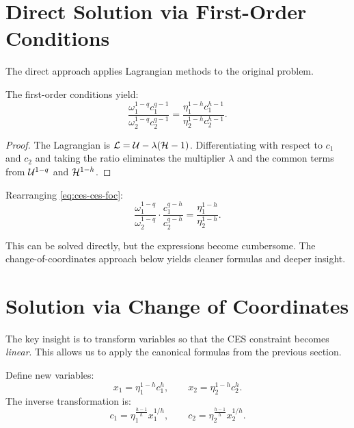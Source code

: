 \section{Direct Solution via First-Order Conditions}
\label{subsec:ces-ces-direct}

The direct approach applies Lagrangian methods to the original problem.

\begin{proposition}
\label{prop:ces-ces-foc}
The first-order conditions yield:
\begin{equation}
\label{eq:ces-ces-foc}
\frac{\omega_1^{1-q} c_1^{q-1}}{\omega_2^{1-q} c_2^{q-1}} = \frac{\eta_1^{1-h} c_1^{h-1}}{\eta_2^{1-h} c_2^{h-1}}.
\end{equation}
\end{proposition}

\begin{proof}
The Lagrangian is $\mathcal{L} = \mathcal{U} - \lambda(\mathcal{H} - 1)$. Differentiating with respect to $c_1$ and $c_2$ and taking the ratio eliminates the multiplier $\lambda$ and the common terms from $\mathcal{U}^{1-q}$ and $\mathcal{H}^{1-h}$.
\end{proof}

Rearranging \eqref{eq:ces-ces-foc}:
\begin{equation}
\label{eq:ces-ces-foc-rearranged}
\frac{\omega_1^{1-q}}{\omega_2^{1-q}} \cdot \frac{c_1^{q-h}}{c_2^{q-h}} = \frac{\eta_1^{1-h}}{\eta_2^{1-h}}.
\end{equation}

This can be solved directly, but the expressions become cumbersome. The change-of-coordinates approach below yields cleaner formulas and deeper insight.

\section{Solution via Change of Coordinates}
\label{subsec:ces-ces-coordinates}

The key insight is to transform variables so that the CES constraint becomes \emph{linear}. This allows us to apply the canonical formulas from the previous section.

\begin{definition}
\label{def:coordinate-transform}
Define new variables:
\begin{equation}
\label{eq:transform-forward}
x_1 = \eta_1^{1-h} c_1^{h}, \qquad x_2 = \eta_2^{1-h} c_2^{h}.
\end{equation}
The inverse transformation is:
\begin{equation}
\label{eq:transform-inverse}
c_1 = \eta_1^{\frac{h-1}{h}} x_1^{1/h}, \qquad c_2 = \eta_2^{\frac{h-1}{h}} x_2^{1/h}.
\end{equation}
\end{definition}

